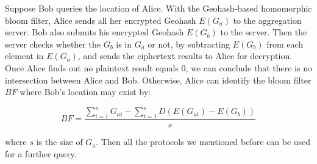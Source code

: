 Suppose Bob queries the location of Alice. With the Geohash-based homomorphic bloom filter, Alice sends all her encrypted Geohash $E(G_a)$ to the aggregation server. Bob also submits his encrypted Geohash $E(G_b)$ to the server. Then the server checks whether the $G_b$ is in $G_a$ or not, by subtracting $E(G_b)$ from each element in $E(G_a)$, and sends the ciphertext results to Alice for decryption. Once Alice finds out no plaintext result equals 0, we can conclude that there is no intersection between Alice and Bob. Otherwise, Alice can identify the bloom filter $BF$ where Bob's location may exist by:


\begin{equation}
BF = \frac{\sum_{i = 1}^{s}G_{ai} - \sum_{i = 1}^{s}D(E(G_{ai}) - E(G_b))}{s}
\label{math:hash_lable}
\end{equation}




where $s$ is the size of $G_a$. Then all the protocols we mentioned before can be used for a further query.




